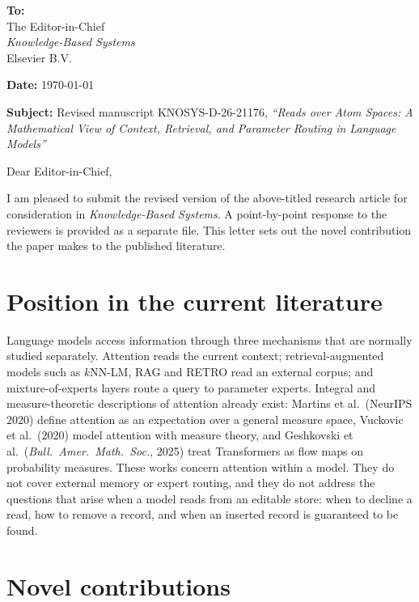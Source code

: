 \documentclass[11pt]{article}
\begin{document}
\textbf{To:}\\
The Editor-in-Chief\\
\emph{Knowledge-Based Systems}\\
Elsevier B.V.

\textbf{Date:} \today

\textbf{Subject:} Revised manuscript KNOSYS-D-26-21176, \emph{``Reads over Atom Spaces: A Mathematical View of Context, Retrieval, and Parameter Routing in Language Models''}

\vspace{0.5em}
Dear Editor-in-Chief,

I am pleased to submit the revised version of the above-titled research article for consideration in \emph{Knowledge-Based Systems}. A point-by-point response to the reviewers is provided as a separate file. This letter sets out the novel contribution the paper makes to the published literature.

\section*{Position in the current literature}

Language models access information through three mechanisms that are normally studied separately. Attention reads the current context; retrieval-augmented models such as $k$NN-LM, RAG and RETRO read an external corpus; and mixture-of-experts layers route a query to parameter experts. Integral and measure-theoretic descriptions of attention already exist: Martins et al.\ (NeurIPS 2020) define attention as an expectation over a general measure space, Vuckovic et al.\ (2020) model attention with measure theory, and Geshkovski et al.\ (\emph{Bull.\ Amer.\ Math.\ Soc.}, 2025) treat Transformers as flow maps on probability measures. These works concern attention within a model. They do not cover external memory or expert routing, and they do not address the questions that arise when a model reads from an editable store: when to decline a read, how to remove a record, and when an inserted record is guaranteed to be found.

\section*{Novel contributions}
\end{document}
